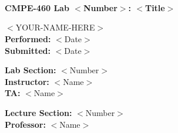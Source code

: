 \documentclass[letterpaper]{article} %
\begin{document}
	
	\begin{adjustwidth*}{2cm}{2cm} %
		
		\begin{center}\ \\ \ \\ \ \\
    		\textbf{CMPE-460 Lab $<$Number$>$: $<$Title$>$} \\ %
		\end{center}
	
		\vspace{16cm} %
		
		\tabto{8.5cm} $<$YOUR-NAME-HERE$>$ \\ %
		\tabto{8.5cm} \textbf{Performed: }$<$Date$>$ \\ %
		\tabto{8.5cm} \textbf{Submitted: }$<$Date$>$  %
				
		\tabto{8.5cm} \textbf{Lab Section: }$<$Number$>$ \\ %
		\tabto{8.5cm} \textbf{Instructor: }$<$Name$>$ \\ %
		\tabto{8.5cm} \textbf{TA: }$<$Name$>$ %
				
		\tabto{8.5cm} \textbf{Lecture Section: }$<$Number$>$ \\ %
		\tabto{8.5cm} \textbf{Professor: }$<$Name$>$ %
		
	\end{adjustwidth*}	
	
	\newpage
	\renewcommand*\contentsname{Table of Contents \hrulefill}  %
	\tableofcontents %
\end{document}
